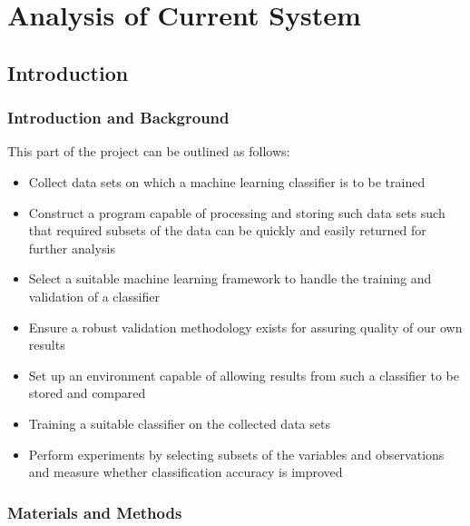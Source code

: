 \part{Analysis of Current System}
\chapter{Introduction}
\ifpdf
    \graphicspath{{Chapter2/Figs/Raster/}{Chapter2/Figs/PDF/}{Chapter2/Figs/}}
\else
    \graphicspath{{Chapter2/Figs/Vector/}{Chapter2/Figs/}}
\fi

\section{Introduction and Background}

This part of the project can be outlined as follows:

\begin{itemize}
    \item Collect data sets on which a machine learning classifier is to be trained
    \item Construct a program capable of processing and storing such data sets
        such that required subsets of the data can be quickly and easily
        returned for further analysis
    \item Select a suitable machine learning framework to handle the training
        and validation of a classifier
    \item Ensure a robust validation methodology exists for assuring quality of
        our own results
    \item Set up an environment capable of allowing results from such a
        classifier to be stored and compared
    \item Training a suitable classifier on the collected data sets
    \item Perform experiments by selecting subsets of the variables and
        observations and measure whether classification accuracy is improved
\end{itemize}

\section{Materials and Methods}
